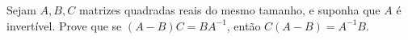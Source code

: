 Sejam \(A,B,C\) matrizes quadradas reais do mesmo tamanho, e suponha que \(A\) é invertível. Prove que se \((A-B)C=BA^{-1}\), então \(C(A-B)=A^{-1}B\).